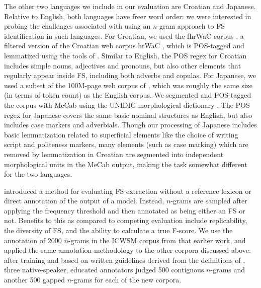 \documentclass[11pt,letterpaper]{article}
\begin{document}
The other two languages we include in our evaluation are Croatian and Japanese. Relative to English, both languages have freer word order: we were interested in probing the challenges associated with using an $n$-gram approach to FS identification in such languages. For Croatian, we used the fhrWaC corpus \cite{snajder2013building}, a filtered version of the Croatian web corpus hrWaC \cite{ljubesic2014bs}, which is POS-tagged and lemmatized using the tools of . Similar to English, the POS regex for Croatian includes simple nouns, adjectives and pronouns, but also other elements that regularly appear inside FS, including both adverbs and copulas. For Japanese, we used a subset of the 100M-page web corpus of , which was roughly the same size (in terms of token count) as the English corpus. We segmented and POS-tagged the corpus with MeCab \cite{Kudo:2008} using the UNIDIC morphological dictionary \cite{Den:2007}. The POS regex for Japanese covers the same basic nominal structures as English, but also includes case markers and adverbials. Though our processing of Japanese includes basic lemmatization related to superficial elements like the choice of writing script and politeness markers, many elements (such as case marking) which are removed by lemmatization in Croatian are segmented into independent morphological units in the MeCab output, making the task somewhat different for the two languages.

 introduced a method for evaluating FS extraction without a reference lexicon or direct annotation of the output of a model. Instead, $n$-grams are sampled after applying the frequency threshold and then annotated as being either an FS or not. Benefits to this as compared to competing evaluation include replicability, the diversity of FS, and the ability to calculate a true F-score.  We use the annotation of 2000 $n$-grams in the ICWSM corpus from that earlier work, and applied the same annotation methodology to the other corpora discussed above: after training and based on written guidelines derived from the definitions of , three native-speaker, educated annotators judged 500 contiguous $n$-grams and another 500 gapped $n$-grams for each of the new corpora. 
\end{document}
